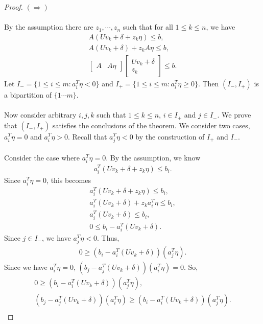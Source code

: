 \documentclass[a4paper]{amsart}
\theoremstyle{remark}
\begin{document}
\begin{proof}
	$(\Longrightarrow)$
	\\\\
	By the assumption there are $z_1, \cdots, z_n$ such that for all $1 \leq k \leq n$, we have
	\begin{gather*}
		A(Uv_k + \delta+z_k\eta) \leq b,\\
		A(Uv_k + \delta)+z_kA\eta \leq b,\\
		\begin{bmatrix}A & A\eta\end{bmatrix}\begin{bmatrix}Uv_k + \delta \\ z_k\end{bmatrix} \leq b.
	\end{gather*}
	Let $I_- = \{1 \leq i \leq m:a_i^T\eta < 0\}$ and $I_+ = \{1 \leq i \leq m:a_i^T\eta \geq 0\}$. Then $(I_-, I_+)$ is a bipartition of $\{1 \cdots m\}$.\\\\
	Now consider arbitrary $i, j, k$ such that $1 \leq k \leq n$, $i \in I_+$ and $j \in I_-$. We prove that $(I_-, I_+)$ satisfies the conclusions of the theorem. We consider two cases, $a_i^T\eta = 0$ and $a_i^T\eta > 0$. Recall that $a_j^T\eta < 0$ by the construction of $I_+$ and $I_-$.\\\\
	Consider the case where $a_i^T\eta = 0$. By the assumption, we know
	\begin{gather*}
		a_i^T(Uv_k+\delta+z_k \eta) \leq b_i.
	\end{gather*}
	Since $a_i^T \eta = 0$, this becomes
	\begin{gather*}
		a_i^T(Uv_k+\delta+z_k \eta) \leq b_i,\\
		a_i^T(Uv_k+\delta)+z_k a_i^T\eta \leq b_i,\\
		a_i^T(Uv_k+\delta) \leq b_i,\\
		0 \leq b_i-a_i^T(Uv_k+\delta).
	\end{gather*}
	Since $j \in I_-$, we have $a_j^T\eta < 0$. Thus,
	\begin{gather*}
		0 \geq (b_i-a_i^T(Uv_k+\delta))(a_j^T\eta).
	\end{gather*}
	Since we have $a_i^T\eta = 0$, $(b_j-a_j^T(Uv_k+\delta))(a_i^T\eta) = 0$. So,
	\begin{gather*}
		0 \geq (b_i-a_i^T(Uv_k+\delta))(a_j^T\eta),\\
		(b_j-a_j^T(Uv_k+\delta))(a_i^T\eta) \geq (b_i-a_i^T(Uv_k+\delta))(a_j^T\eta).\\

\end{gather*}
\end{proof}
\end{document}
